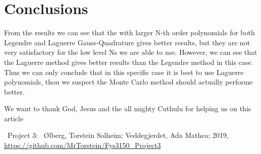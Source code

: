 \documentclass{emulateapj}
\begin{document}
	\section{Conclusions}
	\label{sec:conclusions}
	
	From the results we can see that the with larger N-th order polynomials for both Legendre and Laguerre Gauss-Quadrature gives better results, but they are not very satisfactory for the low level Ns we are able to use. However, we can see that the Laguerre method gives better results than the Legendre method in this case. Thus we can only conclude that in this specific case it is best to use Laguerre polynomials, thou we suspect the Monte Carlo method should actually performe better.
	
	
	
	
	
	
	
	\begin{acknowledgements}
		We want to thank God, Jesus and the all mighty Cuthulu for helping us on this article
	\end{acknowledgements}
	
	\begin{thebibliography}{}
		
		 \ Project 3: \ Ølberg, Torstein Solheim; Veddegjerdet, Ada Mathea; 2019, \url{https://github.com/MrTorstein/Fys3150_Project3}
		
		
	\end{thebibliography}
	
\end{document}
